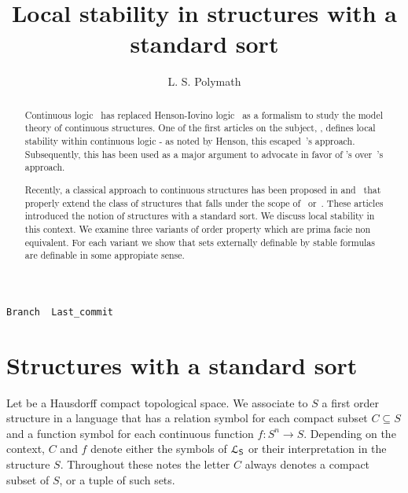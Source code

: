 \documentclass{amsproc}
\author{L. S. Polymath}
\theoremstyle{mio}
\renewcommand*{\emph}[1]{%
   \smash{\tikz[baseline]\node[rectangle, fill=teal!25, rounded corners, inner xsep=0.5ex, inner ysep=0.2ex, anchor=base, minimum height = 2.7ex]{\strut #1};}}
\newcommand\branch{}
\begin{document}
\title{Local stability in structures with a standard sort}
\hfill\texttt{Branch \branch\ Last\_commit \ \DTMnow}\par
\maketitle
\raggedbottom

\begin{abstract}
  Continuous logic~\cite{BBHU} has replaced Henson-Iovino logic~\cite{HI} as a
  formalism to study the model theory of continuous structures.
  One of the first articles on the subject, \cite{BU}, defines local stability within continuous logic - as noted by Henson, this escaped~\cite{HI}'s approach.
  Subsequently, this has been used as a major argument to advocate in favor of \cite{BBHU}'s over~\cite{HI}'s approach.\smallskip

  \noindent
  Recently, a classical approach to continuous structures has been proposed  in \cite{clcl} and~\cite{Z} that properly extend the class of structures that
  falls under the scope of~\cite{HI} or~\cite{BBHU}.
  These articles introduced the notion of structures with a standard sort.
  We discuss local stability in this context.
  We examine three variants of order property which are prima facie non equivalent.
  For each variant we show that sets externally definable by stable formulas are definable in some appropiate sense.
\end{abstract}

\def\medrel#1{\parbox{6ex}{\hfil $#1$}}
\def\ceq#1#2#3{\parbox[t]{13ex}{$\displaystyle #1$}\medrel{#2}{$\displaystyle #3$}}

\section{Structures with a standard sort}

Let \emph{$S$\/} be a Hausdorff compact topological space.
We associate to $S$ a first order structure in a language \emph{${\EuScript L}_{\sf S}$\/} that has a relation symbol for each compact subset $C\subseteq S$ and a function symbol for each continuous function $f:S^n\to S$.
Depending on the context, $C$ and $f$ denote either the symbols of ${\EuScript L}_{\sf S}$ or their interpretation in the structure $S$.
Throughout these notes the letter $C$ always denotes a compact subset of $S$, or a tuple of such sets.
\end{document}

